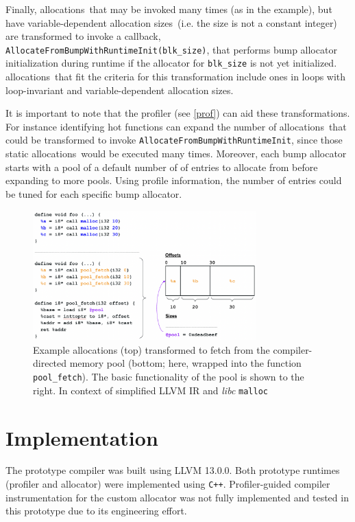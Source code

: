 \documentclass{article}
\def\ALLS{allocations}
\def\SIZES{allocation sizes}
\begin{document}
Finally, \ALLS\ that may be invoked many times (as in the example), but have 
variable-dependent \SIZES\ (i.e. the size is not a constant integer) are transformed to 
invoke a callback, \texttt{AllocateFromBumpWithRuntimeInit(blk\_size)}, that performs 
bump allocator initialization during runtime if the allocator for \texttt{blk\_size} is not
yet initialized. \ALLS\ that fit the criteria for this transformation include ones
in loops with loop-invariant and variable-dependent \SIZES .

It is important to note that the profiler (see \ref{prof}) can aid these transformations.
For instance identifying hot functions can expand the number of \ALLS\ that could
be transformed to invoke \texttt{AllocateFromBumpWithRuntimeInit}, since those static
\ALLS\ would be executed many times. Moreover, each bump allocator starts with a pool of 
a default number of of entries to allocate from before expanding to more pools. Using
profile information, the number of entries could be tuned for each specific bump allocator.

\begin{figure}
    \centering
    \begin{minipage}{0.45\textwidth}
        \centering
        \includegraphics[width=0.77\textwidth]{figs/pool.png} 
        \caption{Example allocations (top) transformed to fetch from the compiler-directed
        memory pool (bottom; here, wrapped into the function \texttt{pool\_fetch}). The 
        basic functionality of the pool is shown to the right. In context of simplified LLVM 
        IR and \textit{libc} \texttt{malloc}}  
	    \label{fig:pool}
    \end{minipage}\hfill
\end{figure}

\section{Implementation}
The prototype compiler was built using LLVM 13.0.0. Both prototype runtimes (profiler and allocator) 
were implemented using \texttt{C++}. Profiler-guided compiler instrumentation for the custom 
allocator was not fully implemented and tested in this prototype due to its engineering effort.
\end{document}
